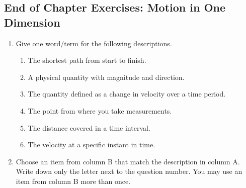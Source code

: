         
    
    \label{m38796*cid13}
            \subsection{ End of Chapter Exercises: Motion in One Dimension}
            \nopagebreak
            
      
      \label{m38796*id81294}\begin{enumerate}[noitemsep, label=\textbf{\arabic*}. ] 
            \label{m38796*uid172}\item Give one word/term for the following descriptions.
\label{m38796*id81309}\begin{enumerate}[noitemsep, label=\textbf{\alph*}. ] 
            \label{m38796*uid173}\item The shortest path from start to finish.
\label{m38796*uid174}\item A physical quantity with magnitude and direction.
\label{m38796*uid175}\item The quantity defined as a change in velocity over a time period.
\label{m38796*uid176}\item The point from where you take measurements.
\label{m38796*uid177}\item The distance covered in a time interval.
\label{m38796*uid178}\item The velocity at a specific instant in time.
\end{enumerate}
                \label{m38796*uid179}\item Choose an item from column B that match the description in column A. Write down only the letter next to the question number. You may use an item from column B more than once.

    
      
    
    \setlength\mytablespace{4\tabcolsep}
    \addtolength\mytablespace{3\arrayrulewidth}
    \setlength\mytablewidth{\linewidth}
        

\end{enumerate}
